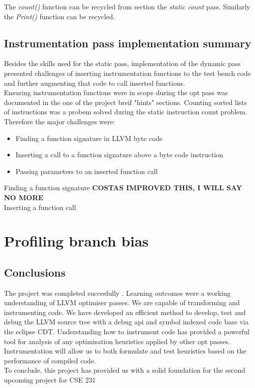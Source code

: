 \documentclass[letterpaper,twocolumn,10pt]{article}
\begin{document}
The \textit{count()} function can be recycled from section the \textit{static count} pass. Similarly the \textit{Print()} function can be recycled.

\subsection{Instrumentation pass implementation summary}
Besides the skills used for the static pass, implementation of the dynamic pass presented challenges of inserting instrumentation functions to the test bench code and further augmenting that code to call inserted functions.\\
Ensuring instrumentation functions were in scope during the opt pass was documented in the one of the project breif "hints" sections. Counting sorted lists of instructions was a probem solved during the static instruction count problem. Therefore the major challenges were: 
\begin{itemize}
\item Finding a function signature in LLVM byte code
\item Inserting a call to a function signature above a byte code instruction
\item Passing parameters to an inserted function call
\end{itemize}

Finding a function signature \textbf{COSTAS IMPROVED THIS, I WILL SAY NO MORE}\\

Inserting a function call 

\section{Profiling branch bias}

\subsection{Conclusions}

The project was completed succesfully . Learning outcomes were a working understanding of LLVM optimiser passes. We are capable of transforming and instrumenting code. We have developed an efficient method to develop, test and debug the LLVM source tree with a debug api and symbol indexed code base via the eclipse CDT. Understanding how to instrument code has provided a powerful tool for analysis of any optimisation heuristics applied by other opt passes. Instrumentation will allow us to both formulate and test heuristics based on the performance of compiled code.\\
To conclude, this project has provided us with a solid foundation for the second upcoming project for CSE 231

{\footnotesize 
}


\theendnotes
\end{document}
